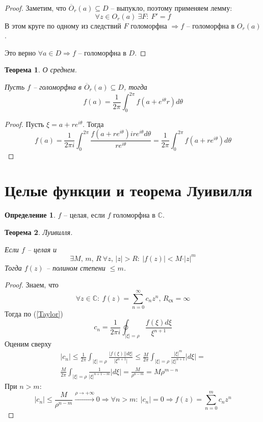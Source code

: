 \documentclass[a4paper,12pt]{article}
\renewcommand{\leq}{\ensuremath{\leqslant}}
\theoremstyle{plain}
\newtheorem{theorem}{Теорема}[section]
\theoremstyle{definition}
\newtheorem{definition}{Определение}[section]
\theoremstyle{remark}
\begin{document}
\begin{proof}
	Заметим, что $\overline{O}_r(a) \subseteq D$ -- выпукло, поэтому применяем лемму:
	\[
		\forall z \in O_r(a) \: \exists F :\: F' = f
	\]
	В этом круге по одному из следствий $F$ голоморфна $\Rightarrow f$ -- голоморфна в $O_r(a)$.

	Это верно $\forall a \in D \Rightarrow f$ -- голоморфна в $D$.
\end{proof}

\begin{theorem}
	О среднем.

	Пусть $f$ -- голоморфна в $\overline{O}_r(a) \subseteq D$, тогда
	\[
		f(a) = \frac{1}{2\pi}\int_0^{2\pi}f(a + e^{i\theta}r)d\theta
	\]
\end{theorem}

\begin{proof}
	Пусть $\xi = a + re^{i\theta}$. Тогда
	\[
		f(a) = \frac{1}{2\pi i}\int_0^{2\pi}\frac{f(a + re^{i\theta})ire^{i\theta}d\theta}{re^{i\theta}} = \frac{1}{2\pi}\int_0^{2\pi}f(a + re^{i\theta})d\theta
	\]
\end{proof}

\section{Целые функции и теорема Луивилля}
\begin{definition}
	$f$ -- целая, если $f$ голоморфна в $\mathbb{C}$.
\end{definition}

\begin{theorem}\label{Lui}
	Луивилля.

	Если $f$ -- целая и
	\[
		\exists M,\,m,\,R \: \forall z,\, \vert z\vert > R :\: \vert f(z)\vert < M\cdot\vert z\vert^m
	\]
	Тогда $f(z)$ -- полином степени $\leq m$.
\end{theorem}

\begin{proof}
	Знаем, что
	\[
		\forall z \in \mathbb{C} :\: f(z) = \sum_{n = 0}^\infty c_nz^n,\, R_{\text{сх}} = \infty
	\]
	Тогда по (\ref{Taylor})
	\[
		c_n = \frac{1}{2\pi i}\oint_{\vert \xi\vert = \rho} \frac{f(\xi)d\xi}{\xi^{n + 1}}
	\]
	Оценим сверху
	\begin{align*}
		\vert c_n\vert \leq \frac{1}{2\pi}\int_{\vert \xi\vert = \rho} \frac{\vert f(\xi)\vert\vert d\xi\vert}{\vert\xi^{n + 1}\vert} \leq \frac{M}{2\pi}\int_{\vert \xi\vert = \rho}\frac{\vert \xi\vert^m}{\vert\xi\vert^{n + 1}}\vert d\xi\vert = \\
		\frac{M}{2\pi}\int_{\vert \xi\vert = \rho}\frac{1}{\vert \xi\vert^{n + 1 - m}}\vert d\xi\vert = \frac{M}{\rho^{n - m}} = M\rho^{m - n}
	\end{align*}
	При $n > m$:
	\[
		\vert c_n\vert \leq \frac{M}{\rho^{n - m}} \overset{\rho \to +\infty}{\to} 0 \Rightarrow \forall n > m :\: \vert c_n\vert = 0 \Rightarrow f(z) = \sum_{n = 0}^m c_nz^n
	\]
\end{proof}
\end{document}
